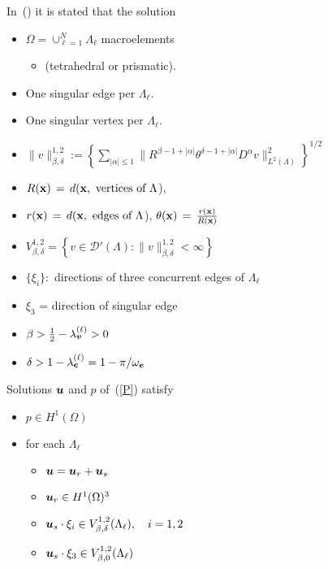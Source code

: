 In~(\cite{put_ref_here}) it is stated that the solution
  \begin{itemize}
    \item
  $\Omega=\cup_{\ell=1}^N \Lambda_\ell$ macroelements
      \begin{itemize}
       \item ({\color{blue}tetrahedral or prismatic}).
    \end{itemize}
  \item One singular edge  per $\Lambda_\ell$.
  \item One singular vertex per $\Lambda_\ell$.\\[5pt]
  \item
$
\|v\|^{1,2}_{\beta,\delta} := \left\{\sum_{|\alpha|\leqslant 1}
\|R^{\beta-1+|\alpha|}\theta^{\delta-1+|\alpha|}D^\alpha v\|_{L^2(\Lambda)}^2\right\}^{1/2}
$
\item $R({\bf x}) \,=\, d({\bf x},\mbox{ vertices of }\Lambda$),
\item $r({\bf x}) \,=\, d({\bf x},\mbox{ edges of }\Lambda$),
$\theta({\bf x})\,=\,\frac{r({\bf x})}{R({\bf x})}$
\item
$
V^{1,2}_{\beta,\delta} = \left\{v\in \mathcal D'(\Lambda): \|v\|^{1,2}_{\beta,\delta} < \infty\right\}
$
  \end{itemize}
\begin{itemize}
\item $\{\xi_i\}:$ directions of three concurrent edges of $\Lambda_\ell$
\item $\xi_3$ = direction of singular edge
\item $\beta > \frac12-\lambda_{\boldsymbol{v}}^{(\ell)} > 0$
\item $\delta > 1-\lambda_{\boldsymbol{e}}^{(\ell)} = 1-\pi/\omega_{\boldsymbol{e}}$
\end{itemize}

 \begin{theorem}
Solutions $\boldsymbol{u}$ and $p$ of~(\ref{P}) satisfy
\begin{itemize}
  \item $p\in H^1(\Omega)$
  \item for each $\Lambda_{\ell}$
  \begin{itemize}
    \item $\boldsymbol{u} = \boldsymbol{u}_r + \boldsymbol{u}_s$\\[5pt]
    \item $\boldsymbol{u}_r\in H^1(\Omega)^3$ \\[5pt]
    \item $\boldsymbol{u}_s\cdot \xi_i\in V^{1,2}_{\beta,\delta}(\Lambda_\ell), \quad i=1,2$ \\[5pt]
    \item $\boldsymbol{u}_s\cdot\xi_3\in V^{1,2}_{\beta,0}(\Lambda_\ell)$
  \end{itemize}
\end{itemize}
\end{theorem}

